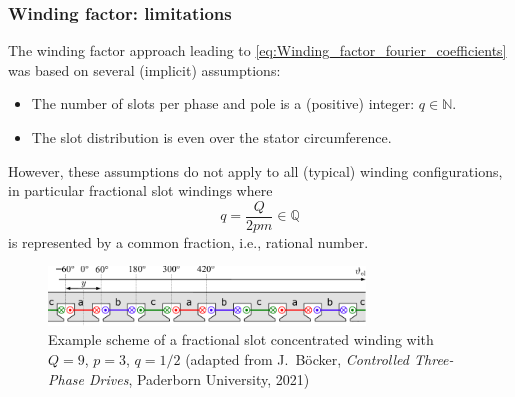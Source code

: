 \begin{frame}
	\frametitle{Winding factor: limitations}
    \onslide<+->
    The winding factor approach leading to \eqref{eq:Winding_factor_fourier_coefficients} was based on several (implicit) assumptions:
    \begin{itemize}
        \item<+-> The number of slots per phase and pole is a (positive) integer: $q \in \mathbb{N}$.
        \item<+-> The slot distribution is even over the stator circumference.
    \end{itemize}
    \onslide<+->
    However, these assumptions do not apply to all (typical) winding configurations, in particular fractional slot windings where $$q=\frac{Q}{2 p m} \in \mathbb{Q}$$ is represented by a common fraction, i.e., rational number. 
    \begin{figure}
        \centering
        \includegraphics[width=0.75\textwidth]{fig/lec05/Fractional_slot_concentrated_winding_example.pdf}
        \caption{Example scheme of a fractional slot concentrated winding with $Q=9$, $p = 3$, $q=1/2$ (adapted from J.~B\"ocker, \textit{Controlled Three-Phase Drives}, Paderborn University, 2021)}
        \label{fig:Fractional_slot_concentrated_winding_example}
    \end{figure}
\end{frame}


